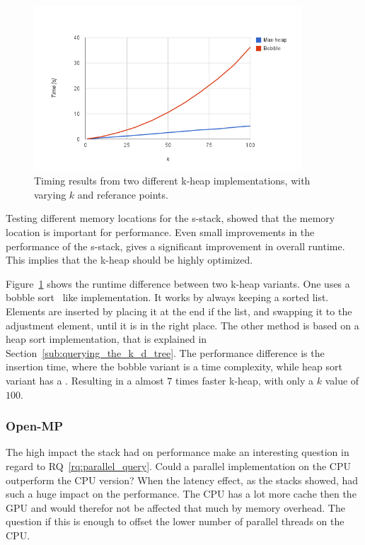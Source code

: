 \begin{figure}[ht!]
    \centering
    \includegraphics[width=100mm]{../gfx/k_stack.png}

    \caption{Timing results from two different k-heap implementations, with varying $k$ and  referance points. }
    \label{tbl:k_stack}
\end{figure}

Testing different memory locations for the s-stack, showed that the memory location is important for performance. Even small improvements in the performance of the s-stack, gives a significant improvement in overall runtime. This implies that the k-heap should be highly optimized.

Figure~\ref{tbl:k_stack} shows the runtime difference between two k-heap variants. One uses a bobble sort~\cite{Cormen:2001} like implementation. It works by always keeping a sorted list. Elements are inserted by placing it at the end if the list, and swapping it to the adjustment element, until it is in the right place. The other method is based on a heap sort implementation, that is explained in Section~\ref{sub:querying_the_k_d_tree}. The performance difference is the insertion time, where the bobble variant is a  time complexity, while heap sort variant has a . Resulting in a almost $7$ times faster k-heap, with only a $k$ value of $100$.

\subsubsection{Open-MP} %
\label{ssub:open_mp_version}

The high impact the stack had on performance make an interesting question in regard to RQ~\ref{rq:parallel_query}. Could a parallel implementation on the CPU outperform the CPU version? When the latency effect, as the stacks showed, had such a huge impact on the performance. The CPU has a lot more cache then the GPU and would therefor not be affected that much by memory overhead. The question if this is enough to offset the lower number of parallel threads on the CPU\@.

